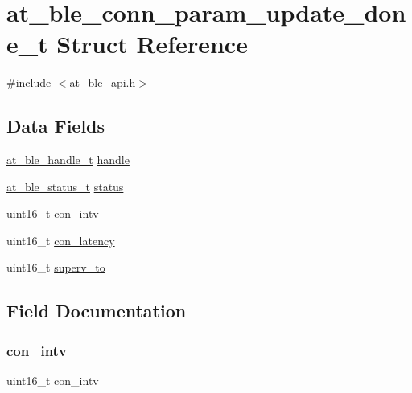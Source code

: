 \hypertarget{structat__ble__conn__param__update__done__t}{}\section{at\+\_\+ble\+\_\+conn\+\_\+param\+\_\+update\+\_\+done\+\_\+t Struct Reference}
\label{structat__ble__conn__param__update__done__t}


{\ttfamily \#include $<$at\+\_\+ble\+\_\+api.\+h$>$}

\subsection*{Data Fields}
\begin{DoxyCompactItemize}
\item 
\mbox{\hyperlink{at__ble__api_8h_abd23646d0c662860741f787efc8456f2}{at\+\_\+ble\+\_\+handle\+\_\+t}} \mbox{\hyperlink{structat__ble__conn__param__update__done__t_ab8b0f353cb6a8d85f0822900e3b7cf35}{handle}}
\item 
\mbox{\hyperlink{group__error__codes__group_ga3b1db9b95feb157b3c188ca27fe76988}{at\+\_\+ble\+\_\+status\+\_\+t}} \mbox{\hyperlink{structat__ble__conn__param__update__done__t_a0b48093fc2030779fc47e5216f8019e2}{status}}
\item 
uint16\+\_\+t \mbox{\hyperlink{structat__ble__conn__param__update__done__t_a52293dc99366700f58014a17e6adc4f8}{con\+\_\+intv}}
\item 
uint16\+\_\+t \mbox{\hyperlink{structat__ble__conn__param__update__done__t_a7a288732b0f90cff943de752cbeb8df4}{con\+\_\+latency}}
\item 
uint16\+\_\+t \mbox{\hyperlink{structat__ble__conn__param__update__done__t_a2bfc39c9b1e75f97c055d5978387570d}{superv\+\_\+to}}
\end{DoxyCompactItemize}


\subsection{Field Documentation}
\mbox{\label{structat__ble__conn__param__update__done__t_a52293dc99366700f58014a17e6adc4f8}} 
\subsubsection{\texorpdfstring{con\_intv}{con\_intv}}
{\footnotesize\ttfamily uint16\+\_\+t con\+\_\+intv}

